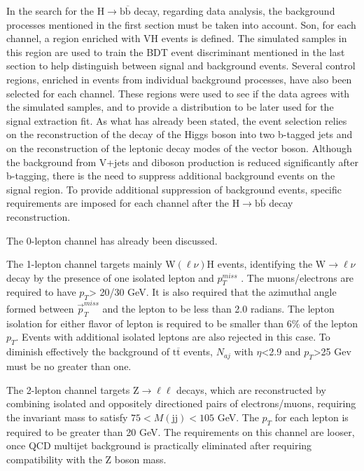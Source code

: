 \documentclass[EPJ,twocolumn]{webofc}
\begin{document}
In the search for the  $\text{H} \rightarrow \text{b}\overline{\text{b}}$ decay,  regarding data analysis, the background processes mentioned in the first section must be taken into account. Son, for each channel, a region enriched with VH events is defined. The simulated samples in this region are used to train the BDT event discriminant mentioned in the last section to help distinguish between signal and background events. Several control regions, enriched in events from individual background processes, have also been selected for each channel. These regions were used to see if the data agrees with the simulated samples, and to provide a distribution to be later used for the signal extraction fit. 
As what has already been stated, the event selection  relies on the reconstruction of the decay of the Higgs boson into two b-tagged jets and on the reconstruction of the leptonic decay modes of the vector boson. Although the background from V+jets and diboson production is reduced significantly after b-tagging, there is the need to suppress additional background events on the signal region. To provide additional suppression of background events, specific requirements are imposed for each channel after the $\text{H}  \rightarrow \text{b}\overline{\text{b}}$ decay reconstruction. 

The 0-lepton channel has already been discussed.


The 1-lepton channel targets mainly W$(\ell \nu)$H events, identifying the $\text{W} \rightarrow \ell \nu$ decay by the presence of one isolated lepton and $p_{T}^{miss}$ . The muons/electrons are required to have $p_{T}$> 20/30 GeV. It is also required that the azimuthal angle formed between $\vec{p}_{T}^{miss}$ and the lepton to be less than 2.0 radians. The lepton isolation for either flavor of lepton is required to be smaller than 6\% of the lepton $p_{T}$. Events with additional isolated leptons are also rejected in this case. To diminish effectively the background of $\text{t}\overline{\text{t}}$ events, $N_{aj}$ with $\eta$<2.9 and $p_{T}$>25 Gev must be no greater than one.

The 2-lepton channel targets $\text{Z} \rightarrow \ell \ell$ decays, which are reconstructed by combining isolated and oppositely directioned pairs of electrons/muons, requiring the invariant mass to satisfy $75< M(\text{jj})<105$ GeV. The $p_{T}$ for each lepton is required to be greater than 20 GeV. The requirements on this channel are looser, once QCD multijet background is practically eliminated after requiring compatibility with the Z boson mass.
\end{document}
